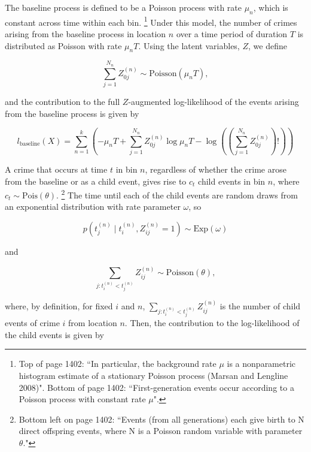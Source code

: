 \documentclass[12pt]{amsart}
\begin{document}
The baseline process is defined to be a Poisson process with rate $\mu_n$, which is constant across time within each bin. \footnote{Top of page 1402: ``In particular, the background rate $\mu$ is a nonparametric histogram estimate of a stationary Poisson process (Marsan and Lengline 2008)". Bottom of page 1402: ``First-generation events occur according to a Poisson process with constant rate $\mu$".}
Under this model, the number of crimes arising from the baseline process  in location $n$ over a time period of duration $T$ is distributed as Poisson with rate $\mu_nT$. Using the latent variables, $Z$, we define

\begin{equation*}
\sum_{j=1}^{N_n} Z_{0j}^{(n)} \sim \text{Poisson}(\mu_nT),
\end{equation*}

and the contribution to the full $Z$-augmented log-likelihood of the events arising from the baseline process is given by 

\begin{equation*}
l_{\text{baseline}}(X) = \sum_{n=1}^k \left ( -\mu_nT + \sum_{j=1}^{N_n}Z_{0j}^{(n)} \log \mu_nT - \log((\sum_{j=1}^{N_n}Z_{0j}^{(n)}) !) \right)  
\end{equation*}

A crime that occurs at time $t$ in bin $n$, regardless of whether the crime arose from the baseline or as a child event, gives rise to $c_t$ child events in bin $n$, where $c_t \sim \text{Pois}(\theta)$. \footnote{Bottom left on page 1402: ``Events (from all generations) each give birth to N direct offspring events, where N is a Poisson random variable with parameter $\theta$."} The time until each of the child events are random draws from an exponential distribution with rate parameter $\omega$, so 

\begin{equation*}
p(t_j^{(n)} \mid t_i^{(n)}, Z_{ij}^{(n)} = 1) \sim \text{Exp}(\omega)%
\end{equation*}

and

\begin{equation*}
\sum_{j : t_i^{(n)} < t_j^{(n)}} Z_{ij}^{(n)} \sim \text{Poisson}(\theta),
\end{equation*}

where, by definition,  for fixed $i$ and $n$, $\sum_{j : t_i^{(n)} < t_j^{(n)}} Z_{ij}^{(n)}$ is the number of child events of crime $i$ from location $n$. Then, the contribution to the log-likelihood of the child events is given by 
\end{document}
